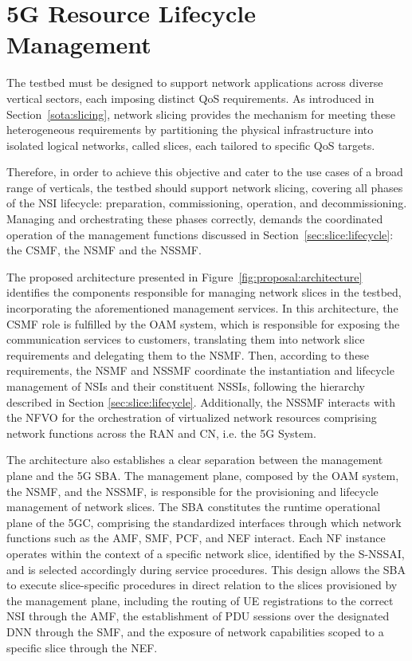\section{\acs{5G} Resource Lifecycle Management}
\label{chap:proposal:resource_lifecycle}

The testbed must be designed to support network applications across diverse vertical sectors, each imposing distinct \acs{QoS} requirements. As introduced in Section~\ref{sota:slicing}, network slicing provides the mechanism for meeting these heterogeneous requirements by partitioning the physical infrastructure into isolated logical networks, called slices, each tailored to specific \acs{QoS} targets.

Therefore, in order to achieve this objective and cater to the use cases of a broad range of verticals, the testbed should support network slicing, covering all phases of the \acs{NSI} lifecycle: preparation, commissioning, operation, and decommissioning. Managing and orchestrating these phases correctly, demands the coordinated operation of the management functions discussed in Section~\ref{sec:slice:lifecycle}: the \acs{CSMF}, the \acs{NSMF} and the \acs{NSSMF}.

The proposed architecture presented in Figure~\ref{fig:proposal:architecture} identifies the components responsible for managing network slices in the testbed, incorporating the aforementioned management services. In this architecture, the \acs{CSMF} role is fulfilled by the \acs{OAM} system, which is responsible for exposing the communication services to customers, translating them into network slice requirements and delegating them to the \acs{NSMF}. Then, according to these requirements, the \acs{NSMF} and \acs{NSSMF} coordinate the instantiation and lifecycle management of \acsp{NSI} and their constituent \acsp{NSSI}, following the hierarchy described in Section \ref{sec:slice:lifecycle}. Additionally, the \acs{NSSMF} interacts with the \acs{NFVO} for the orchestration of virtualized network resources comprising network functions across the \acs{RAN} and \acs{CN}, i.e. the \acs{5G} System.

The architecture also establishes a clear separation between the management plane and the \acs{5G} \acs{SBA}. The management plane, composed by the \acs{OAM} system, the \acs{NSMF}, and the \acs{NSSMF}, is responsible for the provisioning and lifecycle management of network slices. The \acs{SBA} constitutes the runtime operational plane of the \acs{5GC}, comprising the standardized interfaces through which network functions such as the \acs{AMF}, \acs{SMF}, \acs{PCF}, and \acs{NEF} interact. Each \acs{NF} instance operates within the context of a specific network slice, identified by the \acs{S-NSSAI}, and is selected accordingly during service procedures. This design allows the \acs{SBA} to execute slice-specific procedures in direct relation to the slices provisioned by the management plane, including the routing of \acs{UE} registrations to the correct \acs{NSI} through the \acs{AMF}, the establishment of \acs{PDU} sessions over the designated \acs{DNN} through the \acs{SMF}, and the exposure of network capabilities scoped to a specific slice through the \acs{NEF}.

